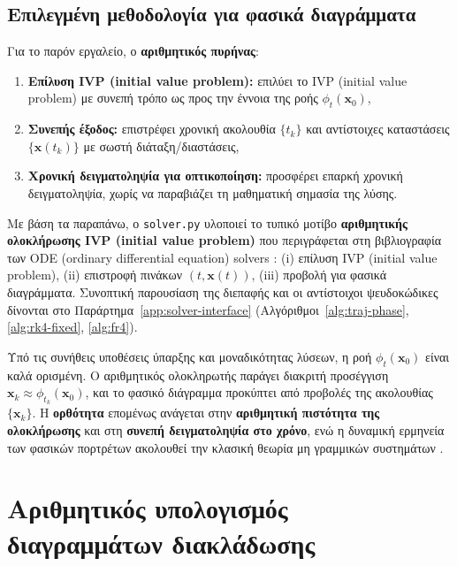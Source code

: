 \documentclass[11pt,a4paper]{report}
\begin{document}
\subsection{Επιλεγμένη μεθοδολογία για φασικά διαγράμματα}
Για το παρόν εργαλείο, ο \textbf{αριθμητικός πυρήνας}:
\begin{enumerate}
  \item \textbf{Επίλυση IVP (initial value problem):} επιλύει το IVP (initial value problem) με συνεπή τρόπο ως προς την έννοια της ροής $\phi_t(\mathbf{x}_0)$,
  \item \textbf{Συνεπής έξοδος:} επιστρέφει χρονική ακολουθία $\{t_k\}$ και αντίστοιχες καταστάσεις $\{\mathbf{x}(t_k)\}$ με σωστή διάταξη/διαστάσεις,
  \item \textbf{Χρονική δειγματοληψία για οπτικοποίηση:} προσφέρει επαρκή χρονική δειγματοληψία, χωρίς να παραβιάζει τη μαθηματική σημασία της λύσης.
\end{enumerate}

Με βάση τα παραπάνω, ο \texttt{solver.py} υλοποιεί το τυπικό μοτίβο \textbf{αριθμητικής ολοκλήρωσης IVP (initial value problem)} που περιγράφεται στη βιβλιογραφία των ODE (ordinary differential equation) solvers \cite{hairer_wanner}:
(i) επίλυση IVP (initial value problem), (ii) επιστροφή πινάκων $(t,\mathbf{x}(t))$, (iii) προβολή για φασικά διαγράμματα.
Συνοπτική παρουσίαση της διεπαφής και οι αντίστοιχοι ψευδοκώδικες
δίνονται στο Παράρτημα~\ref{app:solver-interface}
(Αλγόριθμοι~\ref{alg:traj-phase}, \ref{alg:rk4-fixed}, \ref{alg:fr4}).

Υπό τις συνήθεις υποθέσεις ύπαρξης και μοναδικότητας λύσεων, η ροή $\phi_t(\mathbf{x}_0)$ είναι καλά ορισμένη.
Ο αριθμητικός ολοκληρωτής παράγει διακριτή προσέγγιση $\mathbf{x}_k\approx \phi_{t_k}(\mathbf{x}_0)$, και το φασικό διάγραμμα προκύπτει από προβολές της ακολουθίας $\{\mathbf{x}_k\}$.
Η \textbf{ορθότητα} επομένως ανάγεται στην \textbf{αριθμητική πιστότητα της ολοκλήρωσης} και στη \textbf{συνεπή δειγματοληψία στο χρόνο}, ενώ η δυναμική ερμηνεία των φασικών πορτρέτων ακολουθεί την κλασική θεωρία μη γραμμικών συστημάτων \cite{strogatz_nonlinear,ott_chaos}.


\section{Αριθμητικός υπολογισμός διαγραμμάτων διακλάδωσης}
\end{document}
